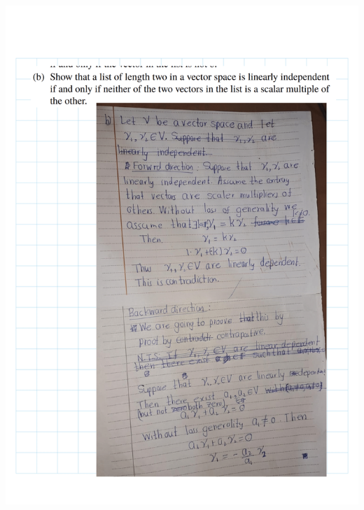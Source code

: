 \documentclass[
]{book}
\theoremstyle{definition}
\theoremstyle{definition}
\theoremstyle{definition}
\theoremstyle{definition}
\theoremstyle{remark}
\begin{document}
\includegraphics{fig/Ex2A/Ex2A-06.png}
\end{document}
